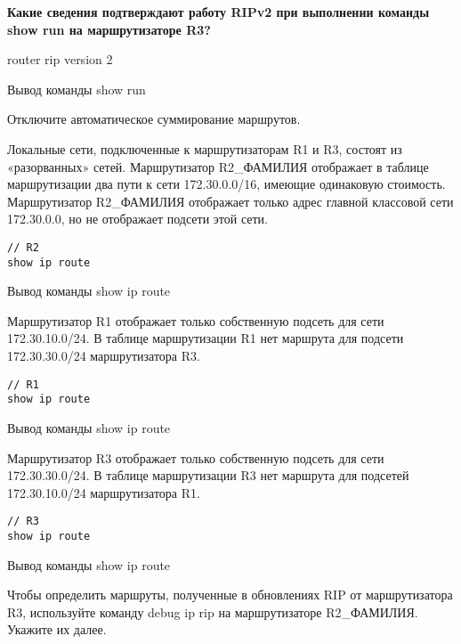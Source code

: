 \textbf{Какие сведения подтверждают работу RIPv2
при выполнении команды show run на маршрутизаторе R3?}

router rip
version 2

\begin{image}
	\caption{Вывод команды show run}
\end{image}

Отключите автоматическое суммирование маршрутов.

Локальные сети, подключенные к маршрутизаторам R1 и R3,
состоят из «разорванных» сетей. Маршрутизатор R2\_ФАМИЛИЯ отображает
в таблице маршрутизации два пути к сети 172.30.0.0/16,
имеющие одинаковую стоимость. Маршрутизатор R2\_ФАМИЛИЯ отображает
только адрес главной классовой сети 172.30.0.0,
но не отображает подсети этой сети.

\begin{verbatim}
// R2
show ip route
\end{verbatim}

\begin{image}
	\caption{Вывод команды show ip route}
\end{image}

Маршрутизатор R1 отображает только собственную подсеть
для сети 172.30.10.0/24. В таблице маршрутизации R1 нет маршрута
для подсети 172.30.30.0/24 маршрутизатора R3.

\begin{verbatim}
// R1
show ip route
\end{verbatim}

\begin{image}
	\caption{Вывод команды show ip route}
\end{image}

Маршрутизатор R3 отображает только собственную подсеть
для сети 172.30.30.0/24. В таблице маршрутизации R3 нет маршрута
для подсетей 172.30.10.0/24 маршрутизатора R1.

\begin{verbatim}
// R3
show ip route
\end{verbatim}

\begin{image}
	\caption{Вывод команды show ip route}
\end{image}

Чтобы определить маршруты, полученные в обновлениях RIP от маршрутизатора R3,
используйте команду debug ip rip на маршрутизаторе R2\_ФАМИЛИЯ.
Укажите их далее.

